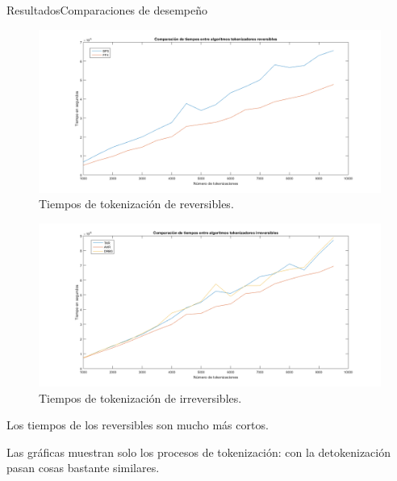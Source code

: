 \begin{frame}{Resultados}{Comparaciones de desempeño}
  {
    \begin{figure}[H]
      \begin{center}
        \includegraphics[width=1.0\linewidth]
          {../../../diagramas_comunes/desempenio/tok_rev.png}
        \caption{Tiempos de tokenización de reversibles.}
      \end{center}
    \end{figure}
  }

  {
    \begin{figure}[H]
      \begin{center}
        \includegraphics[width=1.0\linewidth]
          {../../../diagramas_comunes/desempenio/tok_irrev.png}
        \caption{Tiempos de tokenización de irreversibles.}
      \end{center}
    \end{figure}
  }

  \note
  {
    Los tiempos de los reversibles son mucho más cortos.

    Las gráficas muestran solo los procesos de tokenización: con la
    detokenización pasan cosas bastante similares.
  }

\end{frame}

